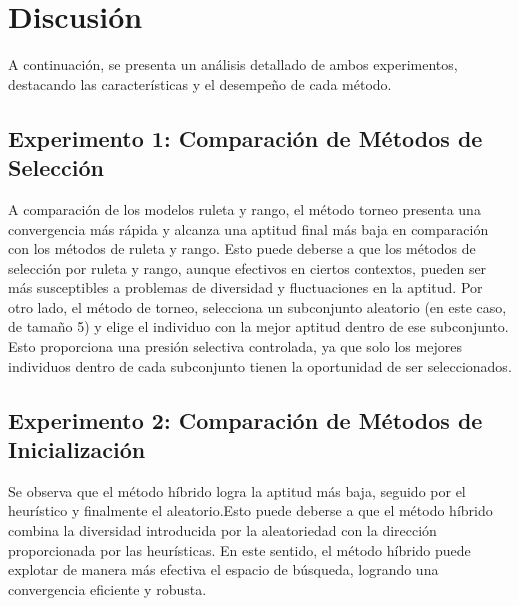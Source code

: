 \section{Discusión}
A continuación, se presenta un análisis detallado de ambos experimentos, destacando las características y el desempeño de cada método.

\subsection{Experimento 1: Comparación de Métodos de Selección}

A comparación de los modelos ruleta y rango, el método torneo presenta una convergencia más rápida y alcanza una aptitud final más baja en comparación con los métodos de ruleta y rango. Esto puede deberse a que los métodos de selección por ruleta y rango, aunque efectivos en ciertos contextos, pueden ser más susceptibles a problemas de diversidad y fluctuaciones en la aptitud. Por otro lado, el método de torneo, selecciona un subconjunto aleatorio (en este caso, de tamaño 5) y elige el individuo con la mejor aptitud dentro de ese subconjunto. Esto proporciona una presión selectiva controlada, ya que solo los mejores individuos dentro de cada subconjunto tienen la oportunidad de ser seleccionados. 


\subsection{Experimento 2: Comparación de Métodos de Inicialización}

Se observa que el método híbrido logra la aptitud más baja, seguido por el heurístico y finalmente el aleatorio.Esto puede deberse a que el método híbrido combina la diversidad introducida por la aleatoriedad con la dirección proporcionada por las heurísticas. En este sentido, el método híbrido puede explotar de manera más efectiva el espacio de búsqueda, logrando una convergencia eficiente y robusta.